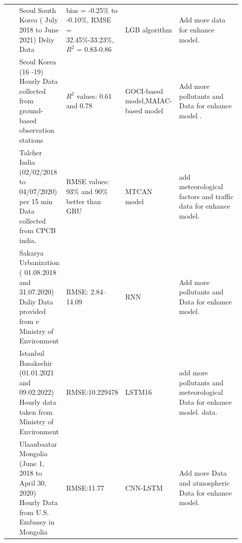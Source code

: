 \documentclass[a4paper,fleqn]{cas-sc}
\begin{document}
\begin{landscape}
{\begin{longtable}[h!]{ p{0.1\linewidth} p{0.2\linewidth} p{0.14\linewidth} p{0.11\linewidth} p{0.38\linewidth} }
 \cite{kim2022short}         & Seoul South Korea ( July 2018 to   June 2021) Deliy Data                                                 & bias = -0.25\% to -0.10\%, RMSE =   32.45\%-33.23\%, $R^2$ = 0.83-0.86                                     & LGB algorithm                                                       & Add more data for enhance model.                                                                            \\
  \cite{lee2021potential}            & Seoul Korea (16 -19) Hourly Data   collected from ground-based observation stations                      & $R^2$ values: 0.61 and 0.78                                                                                & GOCI-based model,MAIAC-based   model                                & Add more pollutants and Data for enhance model .                                                                   \\
 \cite{samal2021multi}  & Talcher India (02/02/2018 to   04/07/2020) per 15 min Data collected from CPCB india.                    & RMSE values: 93\% and 90\% better than GRU                                                              & MTCAN model                                                         & add meteorological factors and traffic data for enhance model.                                                               \\
 \cite{kurnaz2022prediction}          & Sakarya Urbanization (   01.08.2018 and 31.07.2020) Daliy Data provided from e Ministry of Environment   & RMSE:  2.84–14.09                                                                                       & RNN                                                                 & Add more pollutants and Data for enhance model.    \\
 \cite{das2022prediction}           & Istanbul Basaksehir (01.01.2021   and 09.02.2022) Hourly data taken from Ministry of Environment         & RMSE:10.229478                                                                                          & LSTM16                                                              & add more pollutants and  meteorological Data for enhance model. data.                                          \\
\cite{natsagdorj2023prediction}              & Ulaanbaatar Mongolia  (June 1, 2018 to  April 30, 2020) Hourly Data from U.S.   Embassy in Mongolia      & RMSE:11.77                                                                                              & CNN-LSTM                                                            & Add more Data and atmospheric Data for enhance model.  \\

\end{longtable}}
\end{landscape}
\end{document}
